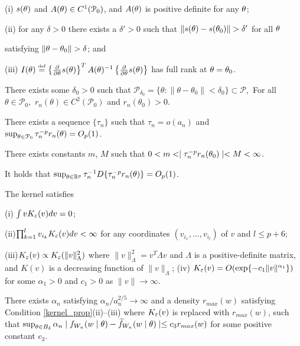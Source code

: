 	 (i) $s({}{\theta})$
	and $A({}{\theta})\in C^{1}(\mathcal{P}_{0})$, and $A({}{\theta})$ is
	positive definite for any ${}{\theta}$; 
	
	 (ii) for any $\delta>0$ there
	exists a $\delta'>0$ such that $\|s(\btheta)-s(\btheta_{0})\|>\delta'$
	for all ${}{\theta}$ 
	
	satisfying $\|\btheta-\btheta_{0}\|>\delta$; and
	
	 (iii) $I(\theta)\stackrel{\hbox{\tiny def}} = \left\{ \frac{\partial}{\partial\theta}s(\theta)\right\} ^{T}A(\theta)^{-1}\left\{ \frac{\partial}{\partial\theta}s(\theta)\right\} $
	has full rank at ${}{\theta}={}{\theta}_{0}$.


 There exists some $\delta_0 > 0$ such that $\mathcal{P}_{\delta_0} = \{\theta: \| \theta-\theta_0\|  < \delta_0  \} \subset \mathcal{P},$ 
For all $\theta \in \mathcal{P}_{0},$ $r_{n}(\theta) \in C^2(\mathcal{P}_{0})$ and $r_{n}(\theta_0)>0$.

	
 There exists a sequence $\{\tau_{n}\}$ %
such that $\tau_{n}=o(a_n)$ and $\sup_{{}{\theta}\in {\cal P}_{0}}\tau_{n}^{-p}r_{n}({}{\theta})=O_{p}(1)$.


 There exists constants $m$, $M$ such that $0 < m <\mid \tau_{n}^{-p}r_{n}({}{\theta}_{0})\mid < M < \infty$.


 It holds that $\sup_{{}{\theta}\in\mathbb{R}^{p}}\tau_{n}^{-1} D\{\tau_{n}^{-p}r_{n}({}{\theta})\}=O_{p}(1)$.

\begin{condition} \label{kernel_prop}
	The kernel satisfies 
	
	 (i) $\int vK_{\varepsilon}(v)dv=0$; 
	
	 (ii)$\prod_{k=1}^{l}v_{i_{k}}K_{\varepsilon}(v)dv<\infty$
	for any coordinates $(v_{i_{1}},\dots,v_{i_{l}})$ of $v$ and $l\leq p+6$;
	
	 (iii)$K_{\varepsilon}(v)\propto K_{\varepsilon}(\|v\|_{\Lambda}^{2})$ where $\|v\|_{\Lambda}^{2}=v^{T}\Lambda v$
	and $\Lambda$ is a positive-definite matrix, and $K(v)$ is a decreasing
	function of $\|v\|_{\Lambda}$; (iv) $K_{\varepsilon}(v)=O(\exp\{-c_{1}\|v\|^{\alpha_{1}}\})$
	for some $\alpha_{1}>0$ and $c_{1}>0$ as $\|v\|\rightarrow\infty$. 
\end{condition}

\begin{condition} \label{sum_approx}
	There exists $\alpha_{n}$ satisfying $\alpha_{n}/a_{n}^{2/5}\rightarrow\infty$
	and a density $r_{max}(w)$ satisfying Condition \ref{kernel_prop}(ii)--(iii) where $K_{\varepsilon}(v)$
	is replaced with $r_{max}(w)$, such that $\sup_{\theta\in B_{\delta}}\alpha_{n}\mid f_{W_{n}}(w\mid\theta)-\widetilde{f}_{W_{n}}(w\mid\theta)\mid\leq c_{3}r_{max}(w)$
	for some positive constant $c_{3}$. 
\end{condition}

